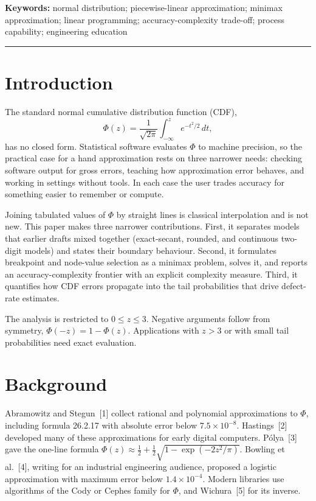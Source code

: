 \documentclass[10pt,a4paper]{article}
\begin{document}
\vspace{6pt}
\noindent\textbf{Keywords:} normal distribution; piecewise-linear approximation; minimax approximation; linear programming; accuracy-complexity trade-off; process capability; engineering education

\vspace{8pt}
\noindent\textcolor{rulegray}{\rule{\textwidth}{0.4pt}}

\section{Introduction}

The standard normal cumulative distribution function (CDF),
\begin{equation}
\Phi(z) = \frac{1}{\sqrt{2\pi}} \int_{-\infty}^{z} e^{-t^{2}/2}\,dt ,
\end{equation}
has no closed form. Statistical software evaluates $\Phi$ to machine precision, so the practical case for a hand approximation rests on three narrower needs: checking software output for gross errors, teaching how approximation error behaves, and working in settings without tools. In each case the user trades accuracy for something easier to remember or compute.

Joining tabulated values of $\Phi$ by straight lines is classical interpolation and is not new. This paper makes three narrower contributions. First, it separates models that earlier drafts mixed together (exact-secant, rounded, and continuous two-digit models) and states their boundary behaviour. Second, it formulates breakpoint and node-value selection as a minimax problem, solves it, and reports an accuracy-complexity frontier with an explicit complexity measure. Third, it quantifies how CDF errors propagate into the tail probabilities that drive defect-rate estimates.

The analysis is restricted to $0 \le z \le 3$. Negative arguments follow from symmetry, $\Phi(-z) = 1 - \Phi(z)$. Applications with $z > 3$ or with small tail probabilities need exact evaluation.

\section{Background}

Abramowitz and Stegun~[1] collect rational and polynomial approximations to $\Phi$, including formula 26.2.17 with absolute error below $7.5\times10^{-8}$. Hastings~[2] developed many of these approximations for early digital computers. P\'olya~[3] gave the one-line formula $\Phi(z) \approx \tfrac12 + \tfrac12\sqrt{1-\exp(-2z^{2}/\pi)}$. Bowling et al.~[4], writing for an industrial engineering audience, proposed a logistic approximation with maximum error below $1.4\times10^{-4}$. Modern libraries use algorithms of the Cody or Cephes family for $\Phi$, and Wichura~[5] for its inverse.
\end{document}
